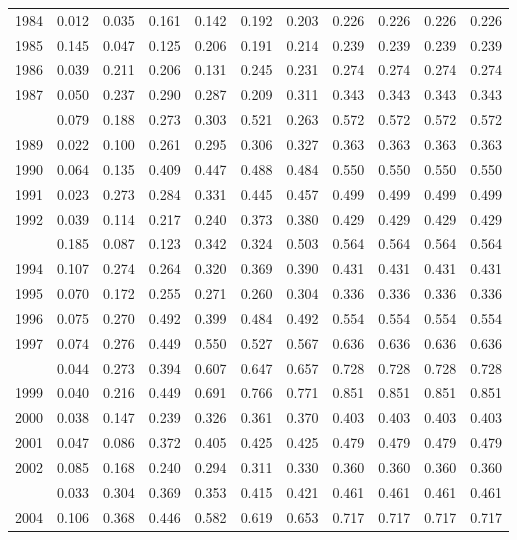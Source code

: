 \documentclass[
]{article}
\begin{document}
\begin{longtable}[t]{lrrrrrrrrrr}
1984 & 0.012 & 0.035 & 0.161 & 0.142 & 0.192 & 0.203 & 0.226 & 0.226 & 0.226 & 0.226\\
1985 & 0.145 & 0.047 & 0.125 & 0.206 & 0.191 & 0.214 & 0.239 & 0.239 & 0.239 & 0.239\\
1986 & 0.039 & 0.211 & 0.206 & 0.131 & 0.245 & 0.231 & 0.274 & 0.274 & 0.274 & 0.274\\
1987 & 0.050 & 0.237 & 0.290 & 0.287 & 0.209 & 0.311 & 0.343 & 0.343 & 0.343 & 0.343\\
\addlinespace
1988 & 0.079 & 0.188 & 0.273 & 0.303 & 0.521 & 0.263 & 0.572 & 0.572 & 0.572 & 0.572\\
1989 & 0.022 & 0.100 & 0.261 & 0.295 & 0.306 & 0.327 & 0.363 & 0.363 & 0.363 & 0.363\\
1990 & 0.064 & 0.135 & 0.409 & 0.447 & 0.488 & 0.484 & 0.550 & 0.550 & 0.550 & 0.550\\
1991 & 0.023 & 0.273 & 0.284 & 0.331 & 0.445 & 0.457 & 0.499 & 0.499 & 0.499 & 0.499\\
1992 & 0.039 & 0.114 & 0.217 & 0.240 & 0.373 & 0.380 & 0.429 & 0.429 & 0.429 & 0.429\\
\addlinespace
1993 & 0.185 & 0.087 & 0.123 & 0.342 & 0.324 & 0.503 & 0.564 & 0.564 & 0.564 & 0.564\\
1994 & 0.107 & 0.274 & 0.264 & 0.320 & 0.369 & 0.390 & 0.431 & 0.431 & 0.431 & 0.431\\
1995 & 0.070 & 0.172 & 0.255 & 0.271 & 0.260 & 0.304 & 0.336 & 0.336 & 0.336 & 0.336\\
1996 & 0.075 & 0.270 & 0.492 & 0.399 & 0.484 & 0.492 & 0.554 & 0.554 & 0.554 & 0.554\\
1997 & 0.074 & 0.276 & 0.449 & 0.550 & 0.527 & 0.567 & 0.636 & 0.636 & 0.636 & 0.636\\
\addlinespace
1998 & 0.044 & 0.273 & 0.394 & 0.607 & 0.647 & 0.657 & 0.728 & 0.728 & 0.728 & 0.728\\
1999 & 0.040 & 0.216 & 0.449 & 0.691 & 0.766 & 0.771 & 0.851 & 0.851 & 0.851 & 0.851\\
2000 & 0.038 & 0.147 & 0.239 & 0.326 & 0.361 & 0.370 & 0.403 & 0.403 & 0.403 & 0.403\\
2001 & 0.047 & 0.086 & 0.372 & 0.405 & 0.425 & 0.425 & 0.479 & 0.479 & 0.479 & 0.479\\
2002 & 0.085 & 0.168 & 0.240 & 0.294 & 0.311 & 0.330 & 0.360 & 0.360 & 0.360 & 0.360\\
\addlinespace
2003 & 0.033 & 0.304 & 0.369 & 0.353 & 0.415 & 0.421 & 0.461 & 0.461 & 0.461 & 0.461\\
2004 & 0.106 & 0.368 & 0.446 & 0.582 & 0.619 & 0.653 & 0.717 & 0.717 & 0.717 & 0.717\\

\end{longtable}
\end{document}
